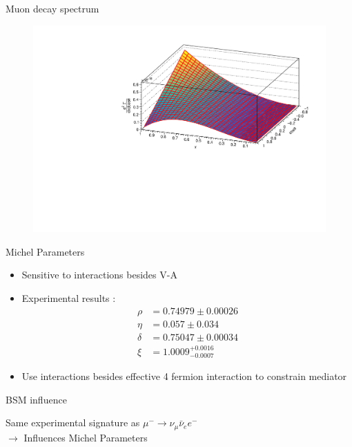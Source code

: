 \documentclass[11pt]{beamer}
\numberwithin{equation}{section}
\begin{document}
\begin{frame}{Muon decay spectrum}
\begin{figure}[H]
  \centering
    \includegraphics[width=\textwidth]{../imgs/MuonSpectrum}
\end{figure}
\end{frame}

\begin{frame}{Michel Parameters}
\begin{itemize}
\item Sensitive to interactions besides V-A
\pause
\item Experimental results \cite{TWIST:2011aa}:
\begin{align*}
\rho &=0.74979 \pm 0.00026\\
\eta &=0.057 \pm 0.034\\
\delta &= 0.75047\pm 0.00034\\
\xi &= 1.0009^{+0.0016}_{-0.0007}
\end{align*}
\pause
\item Use interactions besides effective 4 fermion interaction to constrain mediator
\end{itemize}
\end{frame}

\begin{frame}{BSM influence}
\begin{figure}[H]
\centering
{}
\end{figure}
Same experimental signature as $\mu^-\rightarrow \nu_\mu \bar{\nu}_e e^-$\\
\pause
$\rightarrow$ Influences Michel Parameters
\end{frame}
\end{document}
